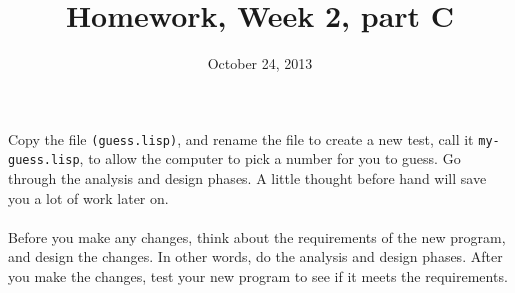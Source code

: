 \documentclass{article}
\title{Homework, Week 2, part C}
\date{October 24, 2013}
\begin{document}
\maketitle{}

\paragraph{}Copy the file \texttt{(guess.lisp)}, and rename the file to create a new test, call it \texttt{my-guess.lisp}, to allow the computer to pick a number for you to guess. Go through the analysis and design phases. A little thought before hand will save you a lot of work later on.

\paragraph{} Before you make any changes, think about the requirements of the new program, and design the changes. In other words, do the analysis and design phases. After you make the changes, test your new program to see if it meets the requirements.
\end{document}

